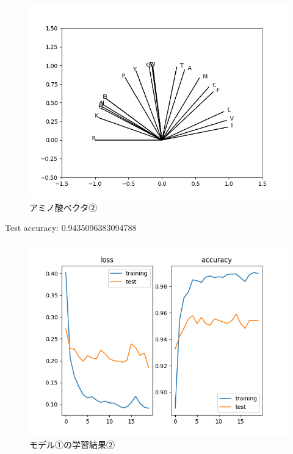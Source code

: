 \documentclass[dvipdfmx]{beamer}
\begin{document}
  \begin{frame}
    \begin{figure}
      \centering
      \includegraphics[keepaspectratio, scale=0.6]{images/my_amino_vector.png}
      \caption{アミノ酸ベクタ②}
    \end{figure}
  \end{frame}

  \begin{frame}
    Test accuracy: 0.9435096383094788
    \begin{figure}
      \centering
      \includegraphics[keepaspectratio, scale=0.6]{images/train_my_ffn.png}
      \caption{モデル①の学習結果②}
    \end{figure}
  \end{frame}
\end{document}
